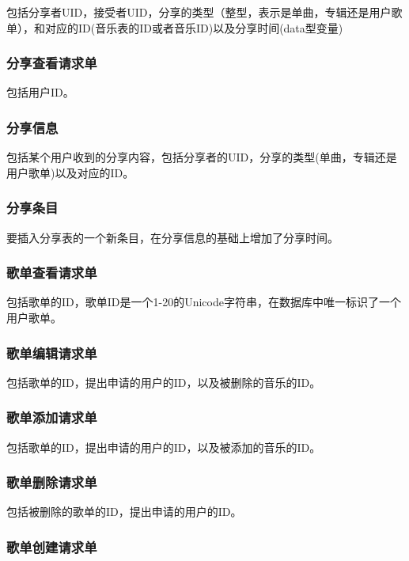包括分享者UID，接受者UID，分享的类型（整型，表示是单曲，专辑还是用户歌单），和对应的ID(音乐表的ID或者音乐ID)以及分享时间(data型变量)

\subsubsection{分享查看请求单}

包括用户ID。

\subsubsection{分享信息}

包括某个用户收到的分享内容，包括分享者的UID，分享的类型(单曲，专辑还是用户歌单)以及对应的ID。

\subsubsection{分享条目}

要插入分享表的一个新条目，在分享信息的基础上增加了分享时间。

\subsubsection{歌单查看请求单}

包括歌单的ID，歌单ID是一个1-20的Unicode字符串，在数据库中唯一标识了一个用户歌单。

\subsubsection{歌单编辑请求单}

包括歌单的ID，提出申请的用户的ID，以及被删除的音乐的ID。

\subsubsection{歌单添加请求单}

包括歌单的ID，提出申请的用户的ID，以及被添加的音乐的ID。

\subsubsection{歌单删除请求单}

包括被删除的歌单的ID，提出申请的用户的ID。

\subsubsection{歌单创建请求单}

